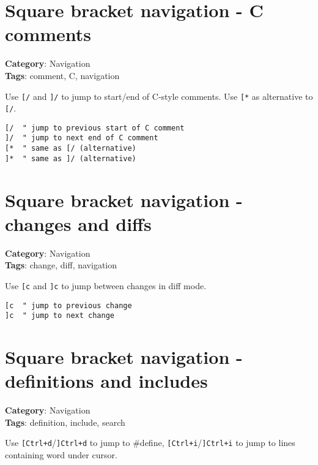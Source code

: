 {{{{{{{{{{\section{Square bracket navigation - C comments}

\textbf{Category}: Navigation\\ \textbf{Tags}: comment, C, navigation
\vspace{0.5cm}

Use {\footnotesize \Verb§[/§} and {\footnotesize \Verb§]/§} to jump to start/end of C-style comments. Use {\footnotesize \Verb§[*§} as alternative to {\footnotesize \Verb§[/§}.

\begin{Exa*}{}
\begin{Verbatim}[fontsize=\footnotesize, breaklines, breakanywhere]
[/  " jump to previous start of C comment
]/  " jump to next end of C comment
[*  " same as [/ (alternative)
]*  " same as ]/ (alternative)
\end{Verbatim}
\end{Exa*}

\section{Square bracket navigation - changes and diffs}

\textbf{Category}: Navigation\\ \textbf{Tags}: change, diff, navigation
\vspace{0.5cm}

Use {\footnotesize \Verb§[c§} and {\footnotesize \Verb§]c§} to jump between changes in diff mode.

\begin{Exa*}{}
\begin{Verbatim}[fontsize=\footnotesize, breaklines, breakanywhere]
[c  " jump to previous change
]c  " jump to next change
\end{Verbatim}
\end{Exa*}

\section{Square bracket navigation - definitions and includes}

\textbf{Category}: Navigation\\ \textbf{Tags}: definition, include, search
\vspace{0.5cm}

Use {\footnotesize \Verb§[Ctrl+d§}/{\footnotesize \Verb§]Ctrl+d§} to jump to \#define, {\footnotesize \Verb§[Ctrl+i§}/{\footnotesize \Verb§]Ctrl+i§} to jump to lines containing word under cursor.

}}}}}}}}}}
